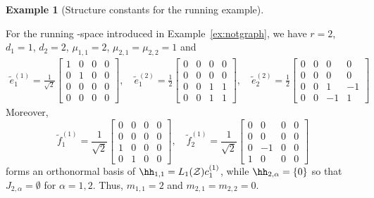 \documentclass[12pt]{amsart}
\theoremstyle{plain}
\theoremstyle{definition}
\newtheorem{example}[theorem]{Example}
\theoremstyle{remark}
\newcommand{\1}{\mathbf{1}}
\begin{document}
\begin{example}[Structure constants for the running example]\label{ex:notgraph-structure-constants}
 
For the running \cBC-space introduced in Example~\ref{ex:notgraph}, we
have $r=2$, $d_1=1$, $d_2=2$, $\mu_{1,1}=2$,
$\mu_{2,1}=\mu_{2,2}=1$ and
\begin{gather*}
\tilde{e}^{(1)}_1 = \frac{1}{\sqrt{2}} \begin{bmatrix} 
1 & 0 & 0 & 0 \\ 0 & 1 & 0 & 0 \\ 0 & 0 & 0 & 0 \\ 0 & 0 & 0 & 0
\end{bmatrix}, \quad
\tilde{e}^{(2)}_1 = \frac{1}{2} \begin{bmatrix} 
0 & 0 & 0 & 0 \\ 0 & 0 & 0 & 0 \\ 0 & 0 & 1 & 1 \\ 0 & 0 & 1 & 1
\end{bmatrix}, \quad
\tilde{e}^{(2)}_2 = \frac{1}{2} \begin{bmatrix} 
0 & 0 & 0 & 0 \\ 0 & 0 & 0 & 0 \\ 0 & 0 & 1 & -1 \\ 0 & 0 & -1 & 1
\end{bmatrix}
\end{gather*}
Moreover,
\[
\tilde{f}^{(1)}_1 = \frac{1}{\sqrt{2}} \begin{bmatrix} 
0 & 0 & 0 & 0 \\ 
0 & 0 & 0 & 0 \\ 
1 & 0 & 0 & 0 \\ 
0 & 1 & 0 & 0
\end{bmatrix}, \quad
\tilde{f}^{(1)}_2 = \frac{1}{\sqrt{2}} \begin{bmatrix} 
0 & 0 & 0 & 0 \\ 
0 & 0 & 0 & 0 \\ 
0 & -1 & 0 & 0 \\ 
1 & 0 & 0 & 0
\end{bmatrix}
\]
forms an orthonormal basis of $\hh_{1,1}=L_1(\mathcal{Z})c_1^{(1)}$, while $\hh_{2,\alpha}=\{0\}$ so that $J_{2,\alpha}=\emptyset$ for $\alpha=1,2$.
Thus, 
$m_{1,1}=2$ and $m_{2,1}=m_{2,2}=0$.


\end{example}
\end{document}
